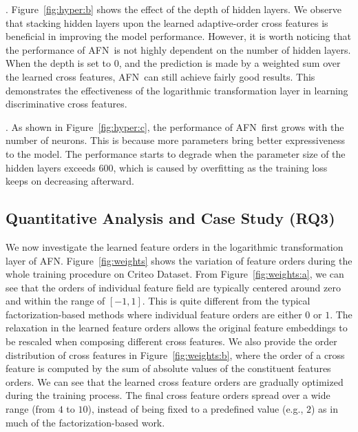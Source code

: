 \documentclass[letterpaper]{article} \usepackage{aaai20}  \usepackage{times}  \usepackage{helvet} \usepackage{courier}  \usepackage[hyphens]{url}  \usepackage{graphicx} \urlstyle{rm} \def\UrlFont{\rm}  \usepackage{graphicx}  \frenchspacing  \setlength{\pdfpagewidth}{8.5in}  \setlength{\pdfpageheight}{11in}
\newcommand{\model}{{AFN}~}
\newcommand{\modelns}{{AFN}}
\begin{document}
.
Figure~\ref{fig:hyper:b} shows the effect of the depth of hidden layers. We observe that stacking hidden layers upon the learned adaptive-order cross features is beneficial in improving the model performance. However, it is worth noticing that the performance of \model is not highly dependent on the number of hidden layers. When the depth is set to 0, and the prediction is made by a weighted sum over the learned cross features, \model can still achieve fairly good results. This demonstrates the effectiveness of the logarithmic transformation layer in learning discriminative cross features.

.
As shown in Figure~\ref{fig:hyper:c}, the performance of \model first grows with the number of neurons. This is because more parameters bring better expressiveness to the model. The performance starts to degrade when the parameter size of the hidden layers exceeds 600, which is caused by overfitting as the training loss keeps on decreasing afterward.

\subsection{Quantitative Analysis and Case Study (RQ3)}


We now investigate the learned feature orders in the logarithmic transformation layer of \modelns. Figure~\ref{fig:weights} shows the variation of feature orders during the whole training procedure on Criteo Dataset. From Figure~\ref{fig:weights:a}, we can see that the orders of individual feature field are typically centered around zero and within the range of $[-1,1]$. This is quite different from the typical factorization-based methods where individual feature orders are either $0$ or $1$. The relaxation in the learned feature orders allows the original feature embeddings to be rescaled when composing different cross features. 
We also provide the order distribution of cross features in Figure~\ref{fig:weights:b}, where the order of a cross feature is computed by the sum of absolute values of the constituent features orders. We can see that the learned cross feature orders are gradually optimized during the training process. The final cross feature orders spread over a wide range (from $4$ to $10$), instead of being fixed to a predefined value (e.g., $2$) as in much of the factorization-based work.
\end{document}
